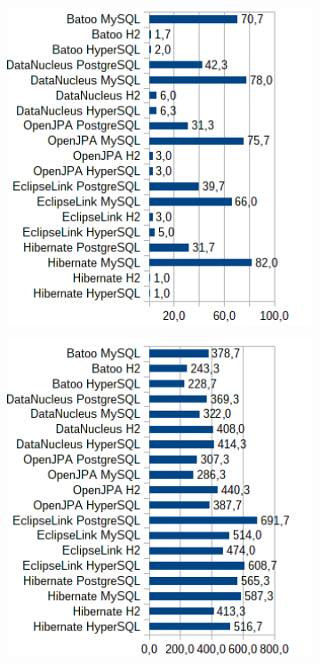 \begin{figure}
\begin{subfigure}[b]{1\textwidth}
\includegraphics[width=25em]{obr/bench/jpa3}
\end{subfigure}
\begin{subfigure}[b]{1\textwidth}
\includegraphics[width=25em]{obr/bench/jpa4}
\end{subfigure}
\end{figure}


